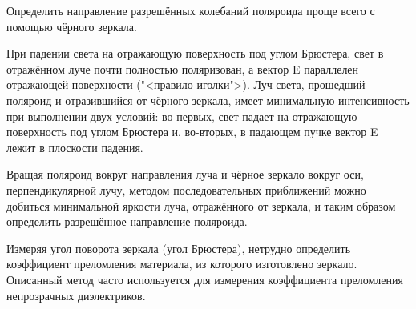 Определить направление разрешённых колебаний поляроида проще всего с помощью чёрного зеркала.
	
При падении света на отражающую поверхность под углом Брюстера, свет в отражённом луче почти полностью поляризован, а вектор E
параллелен отражающей поверхности ("<правило иголки">). Луч света,
прошедший поляроид и отразившийся от чёрного зеркала, имеет минимальную интенсивность при выполнении двух условий: во-первых, свет
падает на отражающую поверхность под углом Брюстера и, во-вторых,
в падающем пучке вектор E лежит в плоскости падения.

Вращая поляроид вокруг направления луча и чёрное зеркало вокруг
оси, перпендикулярной лучу, методом последовательных приближений
можно добиться минимальной яркости луча, отражённого от зеркала,
и таким образом определить разрешённое направление поляроида.

Измеряя угол поворота зеркала (угол Брюстера), нетрудно определить коэффициент преломления материала, из которого изготовлено
зеркало. Описанный метод часто используется для измерения коэффициента преломления непрозрачных диэлектриков.